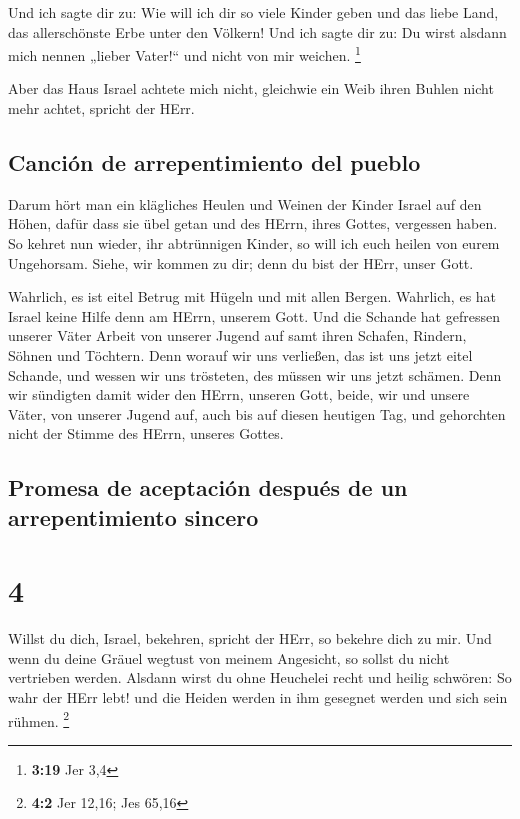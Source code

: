  Und ich sagte dir zu: Wie will ich dir so viele Kinder
geben und das liebe Land, das allerschönste Erbe unter den Völkern! Und
ich sagte dir zu: Du wirst alsdann mich nennen „lieber Vater!{}`` und
nicht von mir weichen. \footnote{\textbf{3:19} Jer 3,4}

 Aber das Haus Israel achtete mich nicht, gleichwie ein
Weib ihren Buhlen nicht mehr achtet, spricht der HErr.

\hypertarget{canciuxf3n-de-arrepentimiento-del-pueblo}{%
\subsection{Canción de arrepentimiento del
pueblo}\label{canciuxf3n-de-arrepentimiento-del-pueblo}}

 Darum hört man ein klägliches Heulen und Weinen der
Kinder Israel auf den Höhen, dafür dass sie übel getan und des HErrn,
ihres Gottes, vergessen haben.  So kehret nun wieder, ihr
abtrünnigen Kinder, so will ich euch heilen von eurem Ungehorsam. Siehe,
wir kommen zu dir; denn du bist der HErr, unser Gott.

 Wahrlich, es ist eitel Betrug mit Hügeln und mit allen
Bergen. Wahrlich, es hat Israel keine Hilfe denn am HErrn, unserem Gott.
 Und die Schande hat gefressen unserer Väter Arbeit von
unserer Jugend auf samt ihren Schafen, Rindern, Söhnen und Töchtern.
 Denn worauf wir uns verließen, das ist uns jetzt eitel
Schande, und wessen wir uns trösteten, des müssen wir uns jetzt schämen.
Denn wir sündigten damit wider den HErrn, unseren Gott, beide, wir und
unsere Väter, von unserer Jugend auf, auch bis auf diesen heutigen Tag,
und gehorchten nicht der Stimme des HErrn, unseres Gottes.

\hypertarget{promesa-de-aceptaciuxf3n-despuuxe9s-de-un-arrepentimiento-sincero}{%
\subsection{Promesa de aceptación después de un arrepentimiento
sincero}\label{promesa-de-aceptaciuxf3n-despuuxe9s-de-un-arrepentimiento-sincero}}

\hypertarget{section-3}{%
\section{4}\label{section-3}}

 Willst du dich, Israel, bekehren, spricht der HErr, so
bekehre dich zu mir. Und wenn du deine Gräuel wegtust von meinem
Angesicht, so sollst du nicht vertrieben werden.  Alsdann
wirst du ohne Heuchelei recht und heilig schwören: So wahr der HErr
lebt! und die Heiden werden in ihm gesegnet werden und sich sein rühmen.
\footnote{\textbf{4:2} Jer 12,16; Jes 65,16}


